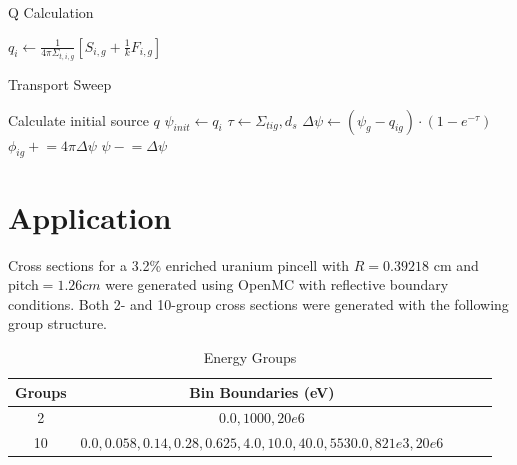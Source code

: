 \documentclass[10pt,letter]{article}
\newcommand{\pluseq}{\mathrel{+}=}
\newcommand{\minuseq}{\mathrel{-}=}
\begin{document}
\begin{algorithm}
    \caption{Q Calculation}\label{alg:qcalc}
    \begin{algorithmic}[1]
        \State $q_i \gets \frac { 1 } { 4 \pi \Sigma _ { t , i , g } } \left[ S _ { i , g } + \frac { 1 } { k } F _ { i , g } \right]$ 
        \EndFor
        \EndFor
    \end{algorithmic}
\end{algorithm}

\begin{algorithm}
    \caption{Transport Sweep}\label{alg:transport}
    \begin{algorithmic}[1]
        \State Calculate initial source $q$
        \State $\psi_{init} \gets q_i$ 
        \State $\tau \gets \Sigma_{tig},d_s$
        \State $\Delta \psi \gets (\psi_g-q_{ig})\cdot(1-e^{-\tau}) $
        \State $\phi_{ig} \pluseq 4\pi\Delta \psi$
        \EndIf
        \State $\psi \minuseq \Delta \psi$
        \EndFor
        \EndFor
        \EndFor
    \end{algorithmic}
\end{algorithm}

\section*{Application}
Cross sections for a 3.2\% enriched uranium pincell with $R=0.39218$ cm and pitch$=1.26 cm$ were generated using OpenMC with reflective boundary conditions. Both 2- and 10-group cross sections were generated with the following group structure. 
\begin{table}[h]
\begin{center}
\caption{Energy Groups} \label{tab:fourfactors}
\begin{tabular}{ |c|c|c|c|c| } 
\hline
Groups & Bin Boundaries (eV)\\ 
\hline
2 & $0.0, 1000, 20e6$ \\
\hline
10 &$0.0, 0.058, 0.14, 0.28, 0.625, 4.0, 10.0, 40.0, 5530.0, 821e3, 20e6$ \\
\hline
\end{tabular}
\end{center}
\end{table}
\end{document}

